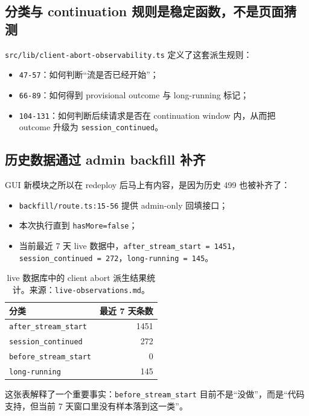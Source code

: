 \documentclass[a4paper]{article}
\newcommand{\filepath}[1]{\nolinkurl{#1}}
\begin{document}
\subsection{分类与 continuation 规则是稳定函数，不是页面猜测}

\filepath{src/lib/client-abort-observability.ts} 定义了这套派生规则：

\begin{itemize}
\item \filepath{47-57}：如何判断“流是否已经开始”；
\item \filepath{66-89}：如何得到 provisional outcome 与 long-running 标记；
\item \filepath{104-131}：如何判断后续请求是否在 continuation window 内，从而把 outcome 升级为 \texttt{session\_continued}。
\end{itemize}

\subsection{历史数据通过 admin backfill 补齐}

GUI 新模块之所以在 redeploy 后马上有内容，是因为历史 499 也被补齐了：

\begin{itemize}
\item \filepath{backfill/route.ts:15-56} 提供 admin-only 回填接口；
\item 本次执行直到 \texttt{hasMore=false}；
\item 当前最近 7 天 live 数据中，\texttt{after\_stream\_start = 1451}，\texttt{session\_continued = 272}，\texttt{long-running = 145}。
\end{itemize}

\begin{table}[H]
\centering
\begin{tabular}{lr}
\toprule
分类 & 最近 7 天条数 \\
\midrule
\texttt{after\_stream\_start} & 1451 \\
\texttt{session\_continued} & 272 \\
\texttt{before\_stream\_start} & 0 \\
\texttt{long-running} & 145 \\
\bottomrule
\end{tabular}
\caption{live 数据库中的 client abort 派生结果统计。来源：\filepath{live-observations.md}。}
\end{table}

这张表解释了一个重要事实：\texttt{before\_stream\_start} 目前不是“没做”，而是“代码支持，但当前 7 天窗口里没有样本落到这一类”。
\end{document}

